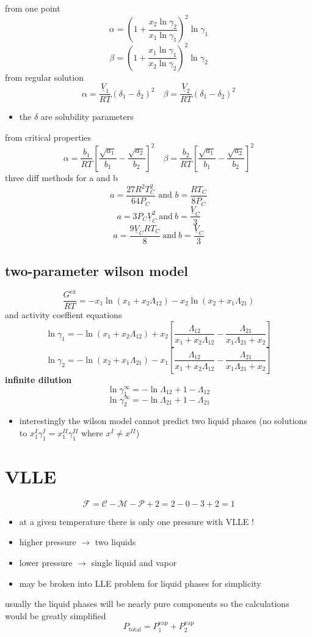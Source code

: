 \documentclass{article}
\begin{document}
from one point
\[\alpha=\left(1+\frac{x_{2}\ln\gamma_{2}}{x_{1}\ln\gamma_{1}}\right)^{2}\ln\gamma_{1}\]
\[\beta=\left(1+\frac{x_{1}\ln\gamma_{1}}{x_{2}\ln\gamma_{2}}\right)^{2}\ln\gamma_{2}\]
from regular solution
\[\alpha=\frac{\underline{V}_{1}}{R T}(\delta_{1}-\delta_{2})^{2} \quad \beta=\frac{\underline{V}_{2}}{R T}(\delta_{1}-\delta_{2})^{2}\]
\begin{itemize}
    \item the $\delta$ are solubility parameters
\end{itemize}
from critical properties
\[\alpha={\frac{b_{1}}{R T}}\left[{\frac{\sqrt{a_{1}}}{b_{1}}}-{\frac{\sqrt{a_{2}}}{b_{2}}}\right]^{2}  \quad \beta={\frac{b_{2}}{R T}}\left[{\frac{\sqrt{a_{1}}}{b_{1}}}-{\frac{\sqrt{a_{2}}}{b_{2}}}\right]^{2}\]
three diff methods for a and b
\[a=\frac{27R^{2}T_{C}^{2}}{64P_{C}}\,\,\mathrm{and}\,\,b=\frac{R T_{C}}{8P_{C}}\]
\[a=3P_{C}\underline{V}_{C}^{2}\ \mathrm{and}\ b=\frac{\underline{V}_{C}}{3}\]
\[a={\frac{9\underline{V}_{C}R T_{C}}{8}}{\mathrm{~and~}}b={\frac{\underline{V}_{C}}{3}}\]
\subsection*{two-parameter wilson model}
\[
\frac{G^{\text{ex}}}{RT} = -x_1 \ln(x_1 + x_2 \Lambda_{12}) - x_2 \ln(x_2 + x_1 \Lambda_{21})
\]
and activity coeffient equations
\[
\ln \gamma_1 = -\ln(x_1 + x_2 \Lambda_{12}) + x_2 \left[ \frac{\Lambda_{12}}{x_1 + x_2 \Lambda_{12}} - \frac{\Lambda_{21}}{x_1 \Lambda_{21} + x_2} \right]
\]
\[
\ln \gamma_2 = -\ln(x_2 + x_1 \Lambda_{21}) - x_1 \left[ \frac{\Lambda_{12}}{x_1 + x_2 \Lambda_{12}} - \frac{\Lambda_{21}}{x_1 \Lambda_{21} + x_2} \right]
\]
\textbf{infinite dilution}
\[
\ln \gamma_1^\infty = -\ln \Lambda_{12} + 1 - \Lambda_{12} 
\]
\[
\ln \gamma_2^\infty = -\ln \Lambda_{21} + 1 - \Lambda_{21}
\]
\begin{itemize}
    \item interestingly the wilson model cannot predict two liquid phases (no solutions to $x_{1}^{I} \gamma_{1}^{I}=x_{1}^{II}\gamma_{1}^{II}$ where $x^{I} \neq x^{II}$)
\end{itemize}

\section*{VLLE}
\[
\mathcal{F} = \mathcal{C} - \mathcal{M} - \mathcal{P} + 2 = 2 - 0 - 3 + 2 = 1
\]
\begin{itemize}
    \item at a given temperature there is only one pressure with VLLE !
    \item higher pressure $\longrightarrow$ two liquids
    \item lower pressure $\longrightarrow$ single liquid and vapor
    \item may be broken into LLE problem for liquid phases for simplicity
\end{itemize}
usually the liquid phases will be nearly pure components so the calculations would be greatly simplified
\[
P_{\mathrm{total}} = P^{\mathrm{vap}}_{1} + P^{\mathrm{vap}}_{2}
\]
\end{document}
